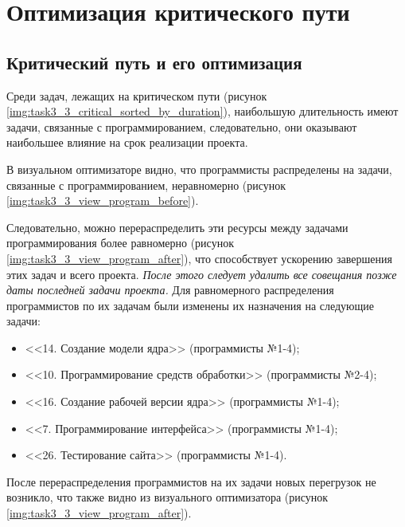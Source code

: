 \section{Оптимизация критического пути}

\subsection{Критический путь и его оптимизация}

Среди задач, лежащих на критическом пути (рисунок \ref{img:task3_3_critical_sorted_by_duration}), наибольшую длительность имеют задачи, связанные с программированием, следовательно, они оказывают наибольшее влияние на срок 
реализации проекта.

В визуальном оптимизаторе видно, что программисты распределены на задачи, связанные с программированием, неравномерно (рисунок \ref{img:task3_3_view_program_before}). 

Следовательно, можно перераспределить эти ресурсы между задачами программирования более равномерно (рисунок \ref{img:task3_3_view_program_after}), что способствует ускорению завершения этих задач и всего проекта. \textit{После этого следует удалить все совещания позже даты последней задачи проекта.} Для равномерного распределения программистов по их задачам были изменены их назначения на следующие задачи:
\begin{itemize}[label = ---]
	\item <<14. Создание модели ядра>> (программисты №1-4);
	\item <<10. Программирование средств обработки>> (программисты №2-4);
	\item <<16. Создание рабочей версии ядра>> (программисты №1-4);
	\item <<7. Программирование интерфейса>> (программисты №1-4);
	\item <<26. Тестирование сайта>> (программисты №1-4).
\end{itemize}

После перераспределения программистов на их задачи новых перегрузок не возникло, что также видно из визуального оптимизатора (рисунок \ref{img:task3_3_view_program_after}).

